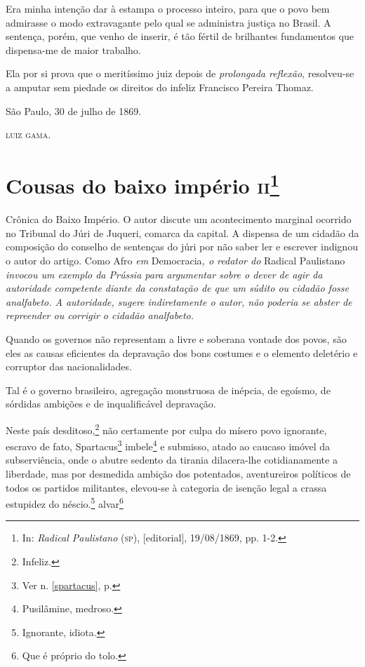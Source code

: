 Era minha intenção dar à estampa o processo inteiro, para que o povo bem
admirasse o modo extravagante pelo qual se administra justiça no Brasil.
A sentença, porém, que venho de inserir, é tão fértil de brilhantes
fundamentos que dispensa-me de maior trabalho.

Ela por si prova que o meritíssimo juiz depois de \emph{prolongada
reflexão}, resolveu-se a amputar sem piedade os direitos do infeliz
Francisco Pereira Thomaz.
\begin{flushright}
São Paulo, 30 de julho de 1869.

\textsc{luiz gama}.
\end{flushright}
\chapter{Cousas do baixo império \textsc{ii}\footnote{In: \emph{Radical
  Paulistano} (\textsc{sp}), {[}editorial{]}, 19/08/1869, pp. 1-2.}}

\begin{didascalia}
Crônica do Baixo Império. O autor discute um acontecimento marginal
ocorrido no Tribunal do Júri de Juqueri, comarca da capital. A dispensa
de um cidadão da composição do conselho de sentenças do júri por não
saber ler e escrever indignou o autor do artigo. Como Afro \emph{em}
Democracia\emph{, o redator do} Radical Paulistano \emph{invocou um
exemplo da Prússia para argumentar sobre o dever de agir da autoridade
competente diante da constatação de que um súdito ou cidadão fosse
analfabeto. A autoridade, sugere indiretamente o autor, não poderia se
abster de repreender ou corrigir o cidadão analfabeto.}
\end{didascalia}



Quando os governos não representam a livre e soberana vontade dos povos,
são eles as causas eficientes da depravação dos bons costumes e o
elemento deletério e corruptor das nacionalidades.

Tal é o governo brasileiro, agregação monstruosa de inépcia, de egoísmo,
de sórdidas ambições e de inqualificável depravação.

Neste país desditoso,\footnote{Infeliz.} não certamente por culpa do
mísero povo ignorante, escravo de fato, Spartacus\footnote{Ver n. \ref{spartacus}, 
p. \pageref{spartacus}} imbele\footnote{Pusilâmine, medroso.} e
submisso, atado ao caucaso imóvel da subserviência, onde o abutre
sedento da tirania dilacera-lhe cotidianamente a liberdade, mas por
desmedida ambição dos potentados, aventureiros políticos de todos os
partidos militantes, elevou-se à categoria de isenção legal a crassa
estupidez do néscio.\footnote{Ignorante, idiota.} alvar\footnote{Que
  é próprio do tolo.}

